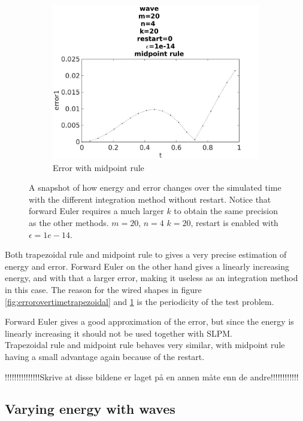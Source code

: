 \begin{figure}[H]
\begin{subfigure}[b]{0.30\textwidth}
                \includegraphics[width=\textwidth]{../MATLAB/fig/errorovertimemidpoint.jpg}
                \caption{ Error with midpoint rule }
                \label{fig:errorovertimemidpoint}
        \end{subfigure}
        \caption{A snapshot of how energy and error changes over the simulated time with the different integration method without restart. Notice that forward Euler requires a much larger $k$ to obtain the same precision as the other methods. $m = 20$, $n = 4$ $k=20$, restart is enabled with $\epsilon = 1e-14$.}
        \label{fig:error}
\end{figure}
Both trapezoidal rule and midpoint rule to gives a very precise estimation of energy and error. Forward Euler on the other hand gives a linearly increasing energy, and with that a larger error, making it useless as an integration method in this case. The reason for the wired shapes in figure \ref{fig:errorovertimetrapezoidal} and \ref{fig:errorovertimemidpoint} is the periodicity of the test problem. 

Forward Euler gives a good approximation of the error, but since the energy is linearly increasing it should not be used together with SLPM. \\

Trapezoidal rule and midpoint rule behaves very similar, with midpoint rule having a small advantage again because of the restart.

!!!!!!!!!!!!!!!Skrive at disse bildene er laget på en annen måte enn de andre!!!!!!!!!!!!\\
\subsection{Varying energy with waves}%

